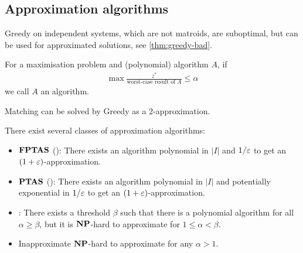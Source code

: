\subsection{Approximation algorithms}
\begin{recall}
    Greedy on independent systems, which are not matroids, are suboptimal, but can be used for approximated solutions, see \autoref{thm:greedy-bad}.
\end{recall}
\begin{definition}
    For a maximisation problem and (polynomial) algorithm $A$, if
    \begin{align*}
        \max \frac{z^*}{\text{worst-case result of $A$}} \leq \alpha
    \end{align*}
    we call $A$ an  algorithm.
\end{definition}
\begin{example}
    Matching can be solved by Greedy as a $2$-approximation.
\end{example}
\begin{definition}
    There exist several classes of approximation algorithms:
    \begin{itemize}
        \item $\mathbf{FPTAS}$ ():
              There exists an algorithm polynomial in $|I|$ and $1/ \varepsilon$ to get an $(1+\varepsilon)$-approximation.
        \item $\mathbf{PTAS}$ ():
              There exists an algorithm polynomial in $|I|$ and potentially exponential in $1/ \varepsilon$ to get an $(1+\varepsilon)$-approximation.
        \item {}: There exists a threshold $\beta$
              such that there is a polynomial algorithm for all $\alpha \geq \beta$, but it is $\mathbf{NP}$-hard
              to approximate for $1\leq \alpha < \beta$.
        \item Inapproximate $\mathbf{NP}$-hard to approximate for any $\alpha > 1$.
    \end{itemize}
\end{definition}


